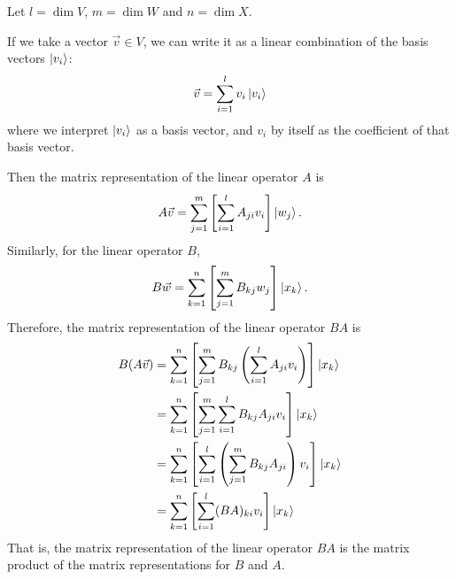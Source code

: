 \documentclass[12pt]{extarticle}
\begin{document}
Let $l=\dim V$, $m=\dim W$ and $n=\dim X$.

If we take a vector $\vec{v}\in V$, we can write it as a linear combination of the basis vectors $\ket{v_i}$:
\[
\vec{v} = \sum_{i=1}^l v_i \ket{v_i}
\]
where we interpret $\ket{v_i}$ as a basis vector, and $v_i$ by itself as the coefficient of that basis vector.

Then the matrix representation of the linear operator $A$ is
\[
A\vec{v} = \sum_{j=1}^m \left[\sum_{i=1}^l A_{ji} v_i\right] \ket{w_j}.
\]
Similarly, for the linear operator $B$,
\[
B\vec{w} = \sum_{k=1}^n \left[\sum_{j=1}^m B_{kj} w_j\right] \ket{x_k}.
\]
Therefore, the matrix representation of the linear operator $BA$ is
\begin{align*}
B(A\vec{v}) & = \sum_{k=1}^n \left[\sum_{j=1}^m B_{kj} \left(\sum_{i=1}^l A_{ji} v_i\right)\right] \ket{x_k} \\
& = \sum_{k=1}^n \left[\sum_{j=1}^m \sum_{i=1}^l B_{kj} A_{ji} v_i\right] \ket{x_k} \\
& = \sum_{k=1}^n \left[\sum_{i=1}^l \left(\sum_{j=1}^m B_{kj} A_{ji}\right) v_i\right] \ket{x_k} \\
& = \sum_{k=1}^n \left[\sum_{i=1}^l (BA)_{ki} v_i\right] \ket{x_k} \\
\end{align*}
That is, the matrix representation of the linear operator $BA$ is the matrix product of the matrix representations for $B$ and $A$.

\end{document}
